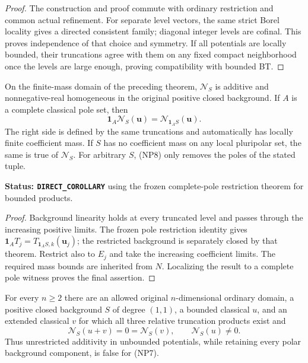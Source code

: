 \begin{proof}
The construction and proof commute with ordinary restriction and
common actual refinement.  For separate level vectors, the same
strict Borel locality gives a directed consistent family; diagonal
integer levels are cofinal.  This proves independence of that choice
and symmetry.  If all potentials are locally bounded, their
truncations agree with them on any fixed compact neighborhood once
the levels are large enough, proving compatibility with bounded BT.
\end{proof}

\begin{corollary}
\label{cor:r11-nonpolar-background-restriction}
On the finite-mass domain of the preceding theorem, $\mathcal N_S$
is additive and nonnegative-real homogeneous in the original positive
closed background.  If $A$ is a complete classical pole set, then
\[
 \mathbf1_A\mathcal N_S(\mathbf u)
                    =\mathcal N_{\mathbf1_A S}(\mathbf u).
 \tag{NP14}
\]
The right side is defined by the same truncations and automatically
has locally finite coefficient mass.  If $S$ has no coefficient mass
on any local pluripolar set, the same is true of $\mathcal N_S$.
For arbitrary $S$, (NP8) only removes the poles of the stated tuple.
\end{corollary}

\noindent\textbf{Status: \texttt{DIRECT\_COROLLARY}} using the
frozen complete-pole restriction theorem for bounded products.

\begin{proof}
Background linearity holds at every truncated level and passes through
the increasing positive limits.  The frozen pole restriction identity
gives $\mathbf1_A T_j=T_{\mathbf1_A S,k}(\mathbf u_j)$;
the restricted background is separately closed by that theorem.
Restrict also to $E_j$ and take the increasing coefficient limits.
The required mass bounds are inherited from $N$.  Localizing the
result to a complete pole witness proves the final assertion.
\end{proof}

\begin{proposition}
\label{prop:r11-nonpolar-additivity-failure}
For every $n\geq2$ there are an allowed original $n$-dimensional
ordinary domain, a positive closed background $S$ of degree $(1,1)$,
a bounded classical $u$, and an extended classical $v$ for which all
three relative truncation products exist and
\[
 \mathcal N_S(u+v)=0=\mathcal N_S(v),
                   \qquad \mathcal N_S(u)\ne0.
 \tag{NP15}
\]
Thus unrestricted additivity in unbounded potentials, while retaining
every polar background component, is false for (NP7).
\end{proposition}

